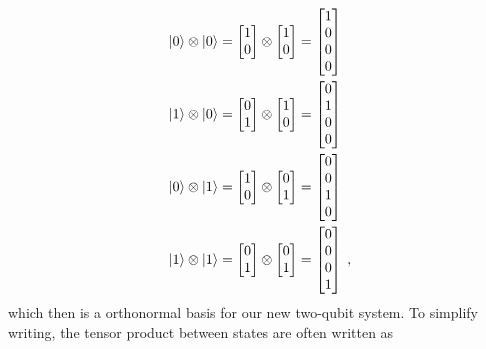 \begin{gather}
\begin{aligned}\label{eq:twoqubit}
    \ket{0} \otimes \ket{0} = \begin{bmatrix} 1 \\ 0 \end{bmatrix} \otimes \begin{bmatrix} 1 \\ 0 \end{bmatrix} &=  \begin{bmatrix} 1 \\ 0 \\ 0 \\ 0\end{bmatrix} \\
    \ket{1} \otimes \ket{0} = \begin{bmatrix} 0 \\ 1 \end{bmatrix} \otimes \begin{bmatrix} 1 \\ 0 \end{bmatrix} &=  \begin{bmatrix} 0 \\ 1 \\ 0 \\ 0\end{bmatrix} \\
    \ket{0} \otimes \ket{1} = \begin{bmatrix} 1 \\ 0 \end{bmatrix} \otimes \begin{bmatrix} 0 \\ 1 \end{bmatrix} &=  \begin{bmatrix} 0 \\ 0 \\ 1 \\ 0\end{bmatrix} \\
    \ket{1} \otimes \ket{1} = \begin{bmatrix} 0 \\ 1 \end{bmatrix} \otimes \begin{bmatrix} 0 \\ 1 \end{bmatrix} &=  \begin{bmatrix} 0 \\ 0 \\ 0 \\ 1\end{bmatrix} \; ,  
\end{aligned}
\end{gather}
which then is a orthonormal basis for our new two-qubit system. To simplify writing, the tensor product between states are often written as

